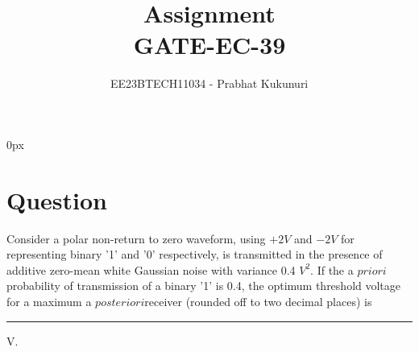 \documentclass[journal,12pt,twocolumn]{IEEEtran}
\theoremstyle{remark}
\begin{document}
\parindent 0px


\vspace{3cm}

\title{Assignment\\[1ex]GATE-EC-39}
\author{EE23BTECH11034 - Prabhat Kukunuri$^{}$%
}
\maketitle
\newpage
\bigskip

\renewcommand{\thefigure}{\theenumi}
\renewcommand{\thetable}{\theenumi}
\section{Question}
Consider a polar non-return to zero  waveform, using $+2V$ and $-2V$ for representing binary '1' and '0' respectively, is transmitted in the presence of additive zero-mean white Gaussian noise with variance 0.4 $V^2$. If the a $priori$ probability of transmission of a binary '1' is 0.4, the optimum threshold voltage for a maximum a $posteriori$receiver (rounded off to two decimal places) is \rule{1.5cm}{0.15mm}V.
\end{document}
